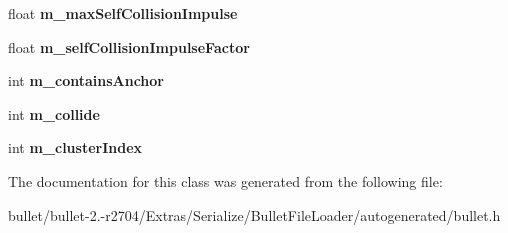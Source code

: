 \begin{DoxyCompactItemize}
\item 
\hypertarget{class_bullet_1_1_soft_body_cluster_data_ad795d157b18ea4f3a69e271ba84d82c7}{float {\bfseries m\+\_\+max\+Self\+Collision\+Impulse}}\label{class_bullet_1_1_soft_body_cluster_data_ad795d157b18ea4f3a69e271ba84d82c7}

\item 
\hypertarget{class_bullet_1_1_soft_body_cluster_data_ab4c5fa2810f53df85fa184b476a51860}{float {\bfseries m\+\_\+self\+Collision\+Impulse\+Factor}}\label{class_bullet_1_1_soft_body_cluster_data_ab4c5fa2810f53df85fa184b476a51860}

\item 
\hypertarget{class_bullet_1_1_soft_body_cluster_data_a788e836ae9fe004c0cd73f345bc3d5fb}{int {\bfseries m\+\_\+contains\+Anchor}}\label{class_bullet_1_1_soft_body_cluster_data_a788e836ae9fe004c0cd73f345bc3d5fb}

\item 
\hypertarget{class_bullet_1_1_soft_body_cluster_data_a807dd3cb884a64d439fc133a55fcd0fc}{int {\bfseries m\+\_\+collide}}\label{class_bullet_1_1_soft_body_cluster_data_a807dd3cb884a64d439fc133a55fcd0fc}

\item 
\hypertarget{class_bullet_1_1_soft_body_cluster_data_afe7a52611efebc2d1e421228a2c0c4c8}{int {\bfseries m\+\_\+cluster\+Index}}\label{class_bullet_1_1_soft_body_cluster_data_afe7a52611efebc2d1e421228a2c0c4c8}

\end{DoxyCompactItemize}


The documentation for this class was generated from the following file\+:\begin{DoxyCompactItemize}
\item 
bullet/bullet-\/2.-\/r2704/\+Extras/\+Serialize/\+Bullet\+File\+Loader/autogenerated/bullet.\+h\end{DoxyCompactItemize}
